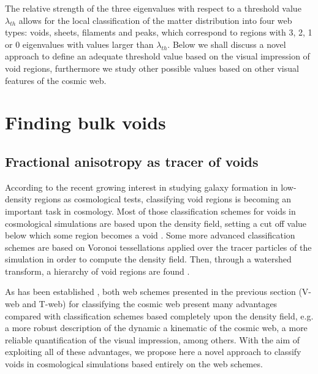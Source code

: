 \documentclass[a4,useAMS,usenatbib,usegraphicx]{latex/mn2e}
\begin{document}
The relative strength of the three eigenvalues with respect to a threshold
value $\lambda_{th}$ allows for the local classification of the matter 
distribution into four web types: voids, sheets, filaments and peaks, 
which correspond to regions with 3, 2, 1 or 0 eigenvalues with values 
larger than $\lambda_{th}$. Below we shall discuss a novel approach to 
define an adequate threshold value based on the visual impression of void
regions, furthermore we study other possible values based on other visual
features of the cosmic web.




\section{Finding bulk voids}
\label{sec:bulk_voids}


\subsection{Fractional anisotropy as tracer of voids}
\label{subsec:FA_voids}


According to the recent growing interest in studying galaxy formation in 
low-density regions as cosmological tests, classifying void regions is 
becoming an important task in cosmology. Most of those classification 
schemes for voids in cosmological simulations are based upon the density 
field, setting a cut off value below which some region becomes a void 
\SRKED{[references]}. Some more advanced classification schemes are based 
on Voronoi tessellations applied over the tracer particles of the 
simulation in order to compute the density field. Then, through a watershed 
transform, a hierarchy of void regions are found .


As has been established \SRKED{[references]}, both web schemes presented 
in the previous section (V-web and T-web) for classifying the cosmic web 
present many advantages compared with classification schemes based
completely upon the density field, e.g. a more robust description of the
dynamic a kinematic of the cosmic web, a more reliable quantification of 
the visual impression, among others. With the aim of exploiting all of 
these advantages, we propose here a novel approach to classify voids in
cosmological simulations based entirely on the web schemes.
\end{document}
